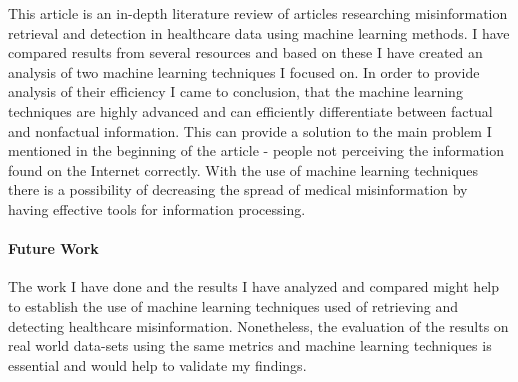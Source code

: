 \documentclass[11pt ,english,a4paper]{article}
\begin{document}
This article is an in-depth literature review of articles researching misinformation retrieval and detection in healthcare data using machine learning methods. I have compared results from several resources and based on these I have created an analysis of two machine learning techniques I focused on. In order to provide analysis of their efficiency I came to conclusion, that the machine learning techniques are highly advanced and can efficiently differentiate between factual and nonfactual information. This can provide a solution to the main problem I mentioned in the beginning of the article - people not perceiving the information found on the Internet correctly. With the use of machine learning techniques there is a possibility of decreasing the spread of medical misinformation by having effective tools for information processing.

\paragraph{Future Work} The work I have done and the results I have analyzed and compared might help to establish the use of machine learning techniques used of retrieving and detecting healthcare misinformation. Nonetheless, the evaluation of the results on real world data-sets using the same metrics and machine learning techniques is essential and would help to validate my findings. 

\newpage


\end{document}
